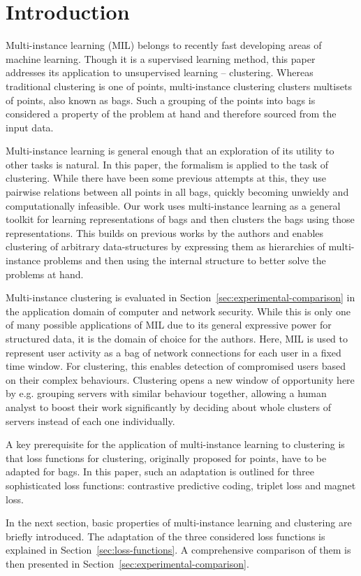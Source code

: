 \section{Introduction}

Multi-instance learning (MIL) belongs to recently fast developing areas of machine learning. Though it is a supervised learning method, this paper addresses its application to unsupervised learning -- clustering. Whereas traditional clustering is one of points, multi-instance clustering clusters multisets of points, also known as bags. Such a grouping of the points into bags is considered a property of the problem at hand and therefore sourced from the input data.

Multi-instance learning is general enough that an exploration of its utility to other tasks is natural. In this paper, the formalism is applied to the task of clustering. While there have been some previous attempts at this, they use pairwise relations between all points in all bags, quickly becoming unwieldy and computationally infeasible. Our work uses multi-instance learning as a general toolkit for learning representations of bags and then clusters the bags using those representations. This builds on previous works by the authors and enables clustering of arbitrary data-structures by expressing them as hierarchies of multi-instance problems and then using the internal structure to better solve the problems at hand.

Multi-instance clustering is evaluated in Section~\ref{sec:experimental-comparison} in the application domain of computer and network security. While this is only one of many possible applications of MIL due to its general expressive power for structured data, it is the domain of choice for the authors. Here, MIL is used to represent user activity as a bag of network connections for each user in a fixed time window. For clustering, this enables detection of compromised users based on their complex behaviours. Clustering opens a new window of opportunity here by e.g. grouping servers with similar behaviour together, allowing a human analyst to boost their work significantly by deciding about whole clusters of servers instead of each one individually.

A key prerequisite for the application of multi-instance learning to clustering is that loss functions for clustering, originally proposed for points, have to be adapted for bags. In this paper, such an adaptation is outlined for three sophisticated loss functions: contrastive predictive coding, triplet loss and magnet loss.

In the next section, basic properties of multi-instance learning and clustering are briefly introduced. The adaptation of the three considered loss functions is explained in Section~\ref{sec:loss-functions}. A comprehensive comparison of them is then presented in Section~\ref{sec:experimental-comparison}.
